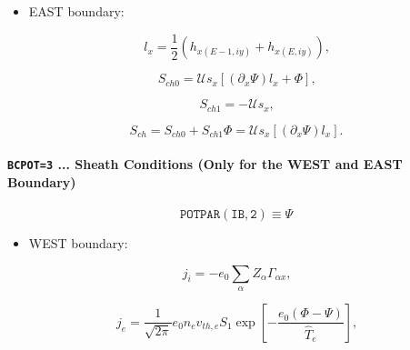 \documentclass[11pt]{article}
\begin{document}
\bigskip

\begin{itemize}
\item  EAST boundary:
\end{itemize}

\bigskip

\begin{equation}
l_{x}=\frac{1}{2}\left( h_{x\left( E-1,iy\right) }+h_{x\left( E,iy\right)
}\right) \text{,}   \label{c311a}
\end{equation}

\begin{equation}
S_{ch0}=\mathcal{U}s_{x}\left[ \left( \partial_{x}\Psi\right) l_{x}+\Phi%
\right] \text{,}   \label{c311}
\end{equation}

\begin{equation}
S_{ch1}=-\mathcal{U}s_{x}\text{,}   \label{c312}
\end{equation}

\begin{equation}
S_{ch}=S_{ch0}+S_{ch1}\Phi=\mathcal{U}s_{x}\left[ \left(
\partial_{x}\Psi\right) l_{x}\right] \text{.}   \label{c313}
\end{equation}

\bigskip

\paragraph{\texttt{BCPOT=3} ... Sheath Conditions (Only for the WEST and
EAST Boundary)}

\bigskip

\begin{equation*}
\mathtt{POTPAR(IB,2)}\equiv\Psi 
\end{equation*}

\bigskip

\begin{itemize}
\item  WEST boundary:
\end{itemize}

\begin{equation}
j_{i}=-e_{0}\sum_{\alpha}Z_{\alpha}\Gamma_{\alpha x}\text{,}   \label{c314}
\end{equation}

\begin{equation}
j_{e}=\frac{1}{\sqrt{2\pi}}e_{0}n_{e}v_{th,e}S_{1}\exp\left[ -\frac
{e_{0}\left( \Phi-\Psi\right) }{\widehat{T}_{e}}\right] \text{,} 
\label{c315}
\end{equation}
\end{document}
